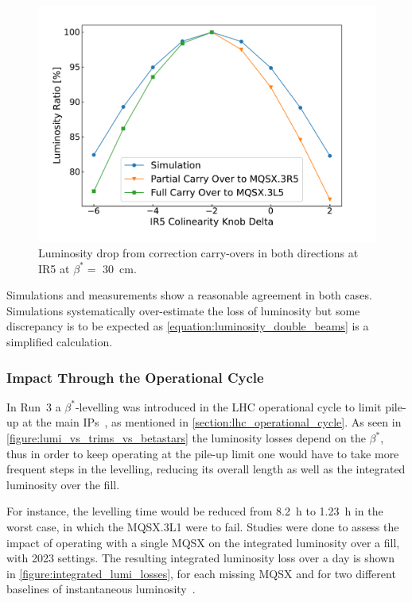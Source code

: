 \begin{figure}[!htb]
    \centering
    \includegraphics*[width=\textwidth]{Figures/IR_Coupling_Correction/ir5_scans_vs_simu.pdf}
    \caption{Luminosity drop from correction carry-overs in both directions at IR\num{5} at \(\beta^{\ast} =\) \qty{30}{\centi\meter}.}
    \label{figure:ir5_carry_over_vs_simulations}
\end{figure}

Simulations and measurements show a reasonable agreement in both cases.
Simulations systematically over-estimate the loss of luminosity but some discrepancy is to be expected as \cref{equation:luminosity_double_beams} is a simplified calculation.  %

\subsubsection*{Impact Through the Operational Cycle}

In Run~\num{3} a \(\beta^{\ast}\)-levelling was introduced in the LHC operational cycle to limit pile-up at the main IPs~\cite{MEETING:Fartoukh:Run3_Configuration}, as mentioned in \cref{section:lhc_operational_cycle}.
As seen in \cref{figure:lumi_vs_trims_vs_betastars} the luminosity losses depend on the \(\beta^{\ast}\), thus in order to keep operating at the pile-up limit one would have to take more frequent steps in the levelling, reducing its overall length as well as the integrated luminosity over the fill.

For instance, the levelling time would be reduced from \qty{8.2}{\hour} to \qty{1.23}{\hour} in the worst case, in which the MQSX.\num{3}L\num{1} were to fail.
Studies were done to assess the impact of operating with a single MQSX on the integrated luminosity over a fill, with \num{2023} settings.
The resulting integrated luminosity loss over a day is shown in \cref{figure:integrated_lumi_losses}, for each missing MQSX and for two different baselines of instantaneous luminosity~\cite{MEETING:Kostoglou:Integrated_Lumi_MQSX_Carryovers}.

